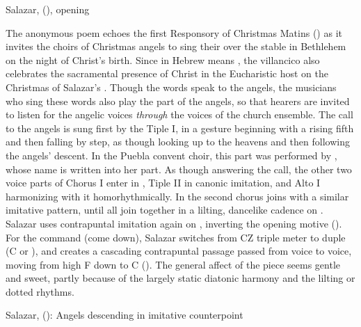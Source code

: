 
{Salazar,  (),
opening}

The anonymous poem echoes the first Responsory of Christmas Matins
() as it invites the choirs of Christmas
angels to sing their  over the stable in Bethlehem on the night
of Christ's birth.
Since  in Hebrew means , the
villancico also celebrates the sacramental presence of Christ in the
Eucharistic host on the Christmas of Salazar's .
Though the words speak to the angels, the musicians who sing these words also
play the part of the angels, so that hearers are invited to listen for the
angelic voices \emph{through} the voices of the church ensemble. 
The call to the angels is sung first by the Tiple I, in a gesture beginning
with a rising fifth and then falling by step, as though looking up to the
heavens and then following the angels' descent.
In the Puebla convent choir, this part was performed by ,
whose name is written into her part.
As though answering the call, the other two voice parts of Chorus I enter in
, Tiple II in canonic imitation, and Alto I harmonizing with it
homorhythmically. 
In  the second chorus joins with a similar imitative
pattern, until all join together in a lilting, dancelike cadence on
.
Salazar uses contrapuntal imitation again on ,
inverting the opening motive ().
For the command  (come down), Salazar switches from CZ
triple meter to duple (C or ), and creates a cascading
contrapuntal passage passed from voice to voice, moving from high F
down to C ().
The general affect of the piece seems gentle and sweet, partly because of the
largely static diatonic harmony and the lilting or dotted rhythms.


{Salazar,  ():
Angels descending in imitative counterpoint}

